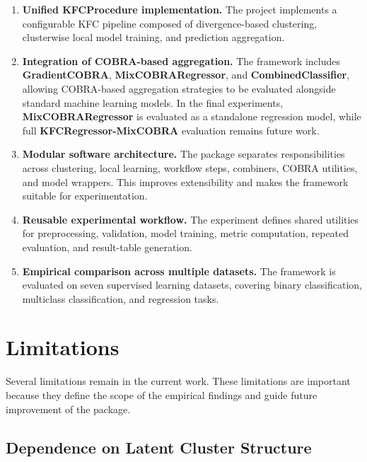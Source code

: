 \begin{enumerate}
\item \textbf{Unified KFCProcedure implementation.} The project implements a configurable KFC pipeline composed of divergence-based clustering, clusterwise local model training, and prediction aggregation.

\item \textbf{Integration of COBRA-based aggregation.} The framework includes \textbf{GradientCOBRA}, \textbf{MixCOBRARegressor}, and \textbf{CombinedClassifier}, allowing COBRA-based aggregation strategies to be evaluated alongside standard machine learning models. In the final experiments, \textbf{MixCOBRARegressor} is evaluated as a standalone regression model, while full \textbf{KFCRegressor-MixCOBRA} evaluation remains future work.

\item \textbf{Modular software architecture.} The package separates responsibilities across clustering, local learning, workflow steps, combiners, COBRA utilities, and model wrappers. This improves extensibility and makes the framework suitable for experimentation.

\item \textbf{Reusable experimental workflow.} The experiment defines shared utilities for preprocessing, validation, model training, metric computation, repeated evaluation, and result-table generation.

\item \textbf{Empirical comparison across multiple datasets.} The framework is evaluated on seven supervised learning datasets, covering binary classification, multiclass classification, and regression tasks.


\end{enumerate}

\section{Limitations}
\label{sec:limitations}

\hs Several limitations remain in the current work. These limitations are important because they define the scope of the empirical findings and guide future improvement of the package.

\subsection{Dependence on Latent Cluster Structure}

